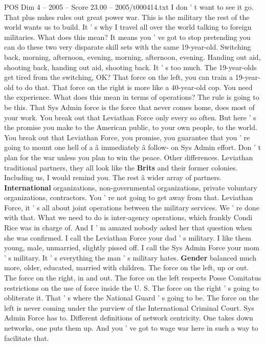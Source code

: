 \begin{textsample}{POS Dim 4 – 2005 – Score 23.00 – 2005/t000414.txt}
I don ' t want to see it go.
That plus nukes rules out great power war.
This is the military the rest of the world wants us to build.
It ' s why I travel all over the world talking to foreign militaries.
What does this mean?
It means you ' ve got to stop pretending you can do these two very disparate skill sets with the same 19-year-old.
Switching back, morning, afternoon, evening, morning, afternoon, evening.
Handing out aid, shooting back, handing out aid, shooting back.
It ' s too much.
The 19-year-olds get tired from the switching, OK?
That force on the left, you can train a 19-year-old to do that.
That force on the right is more like a 40-year-old cop.
You need the experience.
What does this mean in terms of operations?
The rule is going to be this.
That Sys Admin force is the force that never comes home, does most of your work.
You break out that Leviathan Force only every so often.
But here ' s the promise you make to the American public, to your own people, to the world.
You break out that Leviathan Force, you promise, you guarantee that you ' re going to mount one hell of a â immediately â follow- on Sys Admin effort.
Don ' t plan for the war unless you plan to win the peace.
Other differences.
Leviathan traditional partners, they all look like the \textbf{Brits} and their former colonies.
Including us, I would remind you.
The rest â wider array of partners. \textbf{International} organizations, non-governmental organizations, private voluntary organizations, contractors.
You ' re not going to get away from that.
Leviathan Force, it ' s all about joint operations between the military services.
We ' re done with that.
What we need to do is inter-agency operations, which frankly Condi Rice was in charge of.
And I ' m amazed nobody asked her that question when she was confirmed.
I call the Leviathan Force your dad ' s military.
I like them young, male, unmarried, slightly pissed off.
I call the Sys Admin Force your mom ' s military.
It ' s everything the man ' s military hates. \textbf{Gender} balanced much more, older, educated, married with children.
The force on the left, up or out.
The force on the right, in and out.
The force on the left respects Posse Comitatus restrictions on the use of force inside the U.
S.
The force on the right ' s going to obliterate it.
That ' s where the National Guard ' s going to be.
The force on the left is never coming under the purview of the International Criminal Court.
Sys Admin Force has to.
Different definitions of network centricity.
One takes down networks, one puts them up.
And you ' ve got to wage war here in such a way to facilitate that.

\end{textsample}
